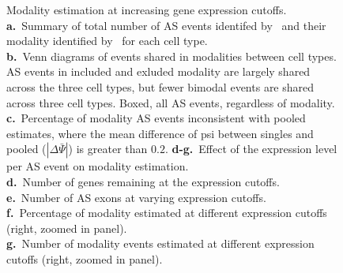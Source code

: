 \clearpage
\thispagestyle{facingcaption}
\begin{figure}[h]
\captionsetup{labelformat=prev-page}
\caption[Modality estimation at increasing gene expression cutoffs.]{Modality estimation at increasing gene expression cutoffs.\\
\textbf{a.}~Summary of total number of AS events identifed by \outrigger\, and their modality identified by \anchor\, for each cell type.\\
\textbf{b.}~Venn diagrams of events shared in modalities between cell types. AS events in included and exluded modality are largely shared across the three cell types, but fewer bimodal events are shared across three cell types. Boxed, all AS events, regardless of modality.\\
\textbf{c.}~Percentage of modality AS events inconsistent with pooled estimates, where the mean difference of psi between singles and pooled ($|\Delta\bar{\Psi}|$) is greater than $0.2$.
\textbf{d-g.}~Effect of the expression level per AS event on modality estimation.\\
\textbf{d.}~Number of genes remaining at the expression cutoffs.\\
\textbf{e.}~Number of AS exons at varying expression cutoffs.\\
\textbf{f.}~Percentage of modality estimated at different expression cutoffs (right, zoomed in panel).\\
\textbf{g.}~Number of modality events estimated at different expression cutoffs (right, zoomed in panel).\\
}
\label{fig:anchor_supplementary}
\end{figure}
\clearpage
